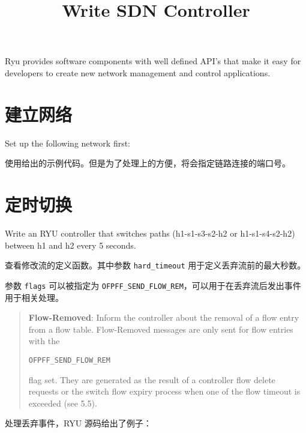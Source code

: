 \endofdump
{}

    \title{Write SDN Controller}
    \maketitle
    \tableofcontents
    \vfill
    Ryu provides software components with well defined API's that make it easy for developers to create new network management and control applications.
    \vfill
    \clearpage
    \section{建立网络}
    Set up the following network first:
    
    \hfill
    

    使用给出的示例代码。但是为了处理上的方便，将会指定链路连接的端口号。

    \section{定时切换}
    Write an RYU controller that switches paths (h1-s1-s3-s2-h2 or h1-s1-s4-s2-h2) between h1 and h2 every 5 seconds. 

    查看修改流的定义函数。其中参数 \texttt{hard\_timeout} 用于定义丢弃流前的最大秒数。

    
    参数 \texttt{flags} 可以被指定为 \texttt{OFPFF\_SEND\_FLOW\_REM}，可以用于在丢弃流后发出事件用于相关处理。

    \begin{quotation}
    \textbf{Flow-Removed}: Inform the controller about the removal of a flow entry from a flow table. Flow-Removed messages are only sent for flow entries with the 
    \begin{center}
        \verb"OFPFF_SEND_FLOW_REM"
    \end{center} flag set. They are
generated as the result of a controller flow delete requests or the switch flow expiry process when one of the
flow timeout is exceeded (see 5.5).\cite{openflow13}
    \end{quotation}


    处理丢弃事件，RYU 源码给出了例子：


